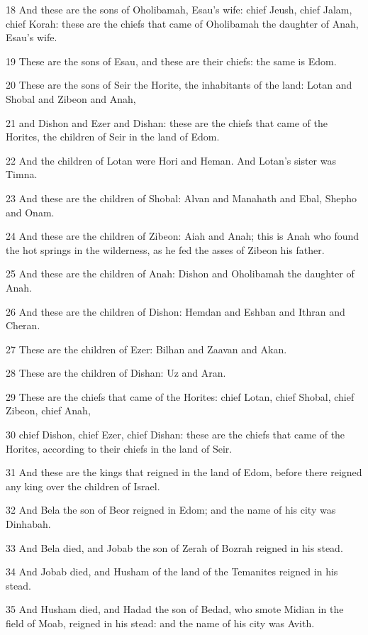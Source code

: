 \par 18 And these are the sons of Oholibamah, Esau's wife: chief Jeush, chief Jalam, chief Korah: these are the chiefs that came of Oholibamah the daughter of Anah, Esau's wife.
\par 19 These are the sons of Esau, and these are their chiefs: the same is Edom.
\par 20 These are the sons of Seir the Horite, the inhabitants of the land: Lotan and Shobal and Zibeon and Anah,
\par 21 and Dishon and Ezer and Dishan: these are the chiefs that came of the Horites, the children of Seir in the land of Edom.
\par 22 And the children of Lotan were Hori and Heman. And Lotan's sister was Timna.
\par 23 And these are the children of Shobal: Alvan and Manahath and Ebal, Shepho and Onam.
\par 24 And these are the children of Zibeon: Aiah and Anah; this is Anah who found the hot springs in the wilderness, as he fed the asses of Zibeon his father.
\par 25 And these are the children of Anah: Dishon and Oholibamah the daughter of Anah.
\par 26 And these are the children of Dishon: Hemdan and Eshban and Ithran and Cheran.
\par 27 These are the children of Ezer: Bilhan and Zaavan and Akan.
\par 28 These are the children of Dishan: Uz and Aran.
\par 29 These are the chiefs that came of the Horites: chief Lotan, chief Shobal, chief Zibeon, chief Anah,
\par 30 chief Dishon, chief Ezer, chief Dishan: these are the chiefs that came of the Horites, according to their chiefs in the land of Seir.
\par 31 And these are the kings that reigned in the land of Edom, before there reigned any king over the children of Israel.
\par 32 And Bela the son of Beor reigned in Edom; and the name of his city was Dinhabah.
\par 33 And Bela died, and Jobab the son of Zerah of Bozrah reigned in his stead.
\par 34 And Jobab died, and Husham of the land of the Temanites reigned in his stead.
\par 35 And Husham died, and Hadad the son of Bedad, who smote Midian in the field of Moab, reigned in his stead: and the name of his city was Avith.
